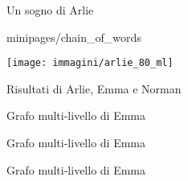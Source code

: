 \documentclass[xcolor=x11names,compress]{beamer}
\begin{document}
{
\begin{frame}[t]{Un sogno di Arlie}
    \vspace{-0.2cm}
    
    
     {minipages/chain_of_words}
    
    \begin{minipage}[t]{\textwidth}
        \hspace{-0.7cm}
        \texttt{[image: immagini/arlie\_80\_ml]}
    \end{minipage}
\end{frame}}

{
\begin{frame}[t]{Risultati di Arlie, Emma e Norman}
    \vspace{-0.5cm}
    
\end{frame}}

{
\begin{frame}[t]{Grafo multi-livello di Emma}
    
\end{frame}}

{
\begin{frame}[t]{Grafo multi-livello di Emma}
    
\end{frame}}

{
\begin{frame}[t]{Grafo multi-livello di Emma}
    
\end{frame}}
\end{document}
